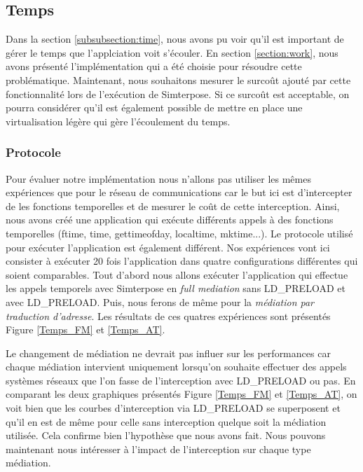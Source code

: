 \subsection{Temps}
\label{section:temps}
Dans la section \ref{subsubsection:time}, nous avons pu voir qu'il est important de gérer le temps que l'applciation voit s'écouler. En section \ref{section:work}, nous avons présenté l'implémentation qui a été choisie pour résoudre cette problématique. Maintenant, nous souhaitons mesurer le surcoût ajouté par cette fonctionnalité lors de l'exécution de Simterpose. Si ce surcoût est acceptable, on pourra considérer qu'il est également possible de mettre en place une virtualisation légère qui gère l'écoulement du temps.

\subsubsection{Protocole}
Pour évaluer notre implémentation nous n'allons pas utiliser les mêmes expériences que pour le réseau de communications car le but ici est d'intercepter de les fonctions temporelles et de mesurer le coût de cette interception. Ainsi, nous avons créé une application qui exécute différents appels à des fonctions temporelles (ftime, time, gettimeofday, localtime, mktime...). Le protocole utilisé pour exécuter l'application est également différent. Nos expériences vont ici consister à exécuter 20 fois l'application dans quatre configurations différentes qui soient comparables. Tout d'abord nous allons exécuter l'application qui effectue les appels temporels avec Simterpose en \textit{full mediation} sans LD\_PRELOAD et avec LD\_PRELOAD. Puis, nous ferons de même pour la \textit{médiation par traduction d'adresse}. Les résultats de ces quatres expériences sont présentés Figure \ref{Temps_FM} et \ref{Temps_AT}.

Le changement de médiation ne devrait pas influer sur les performances car chaque médiation intervient uniquement lorsqu'on souhaite effectuer des appels systèmes réseaux que l'on fasse de l'interception avec LD\_PRELOAD ou pas. En comparant les deux graphiques présentés Figure \ref{Temps_FM} et \ref{Temps_AT}, on voit bien que les courbes d'interception via LD\_PRELOAD se superposent et qu'il en est de même pour celle sans interception quelque soit la médiation utilisée. Cela confirme bien l'hypothèse que nous avons fait. Nous pouvons maintenant nous intéresser à l'impact de l'interception sur chaque type médiation.

